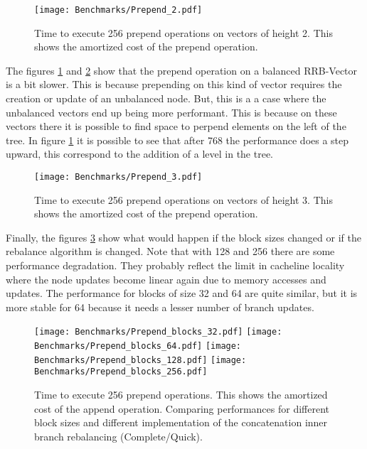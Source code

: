 \begin{figure}[h!]
  \centering
  \texttt{[image: Benchmarks/Prepend\_2.pdf]}
  \caption{Time to execute 256 prepend operations on vectors of height 2. This shows the amortized cost of the prepend operation.}
  \label{Prepend2Benchmarks}
\end{figure}

The figures \ref{Prepend2Benchmarks} and \ref{Prepend3Benchmarks} show that the prepend operation on a balanced RRB-Vector is a bit slower. This is because prepending on this kind of vector requires the creation or update of an unbalanced node. But, this is a a case where the unbalanced vectors end up being more performant. This is because on these vectors there it is possible to find space to perpend elements on the left of the tree. In figure \ref{Prepend2Benchmarks} it is possible to see that after 768 the performance does a step upward, this correspond to the addition of a level in the tree.

\begin{figure}[h!]
  \centering
  \texttt{[image: Benchmarks/Prepend\_3.pdf]}
  \caption{Time to execute 256 prepend operations on vectors of height 3. This shows the amortized cost of the prepend operation.}
  \label{Prepend3Benchmarks}
\end{figure}

\FloatBarrier

Finally, the figures \ref{PrependBlocksBenchmarks} show what would happen if the block sizes changed or if the rebalance algorithm is changed. Note that with 128 and 256 there are some performance degradation. They probably reflect the limit in cacheline locality where the node updates become linear again due to memory accesses and updates. The performance for blocks of size 32 and 64 are quite similar, but it is more stable for 64 because it needs a lesser number of branch updates.

\begin{figure}[h!]
  \centering
  \texttt{[image: Benchmarks/Prepend\_blocks\_32.pdf]}
  \texttt{[image: Benchmarks/Prepend\_blocks\_64.pdf]}
  \texttt{[image: Benchmarks/Prepend\_blocks\_128.pdf]}
  \texttt{[image: Benchmarks/Prepend\_blocks\_256.pdf]}
  \caption{Time to execute 256 prepend operations. This shows the amortized cost of the append operation. Comparing performances for different block sizes and different implementation of the concatenation inner branch rebalancing (Complete/Quick).}
  \label{PrependBlocksBenchmarks}
\end{figure}

